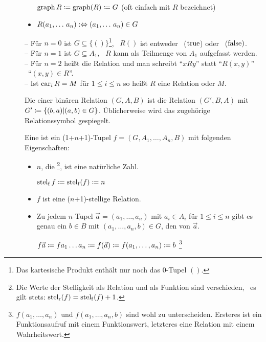 \begin{description}
\begin{itemize}
		$\operatorname*{graph} R \coloneqq \operatorname*{graph}(R) \coloneqq G$ (oft einfach mit $R$ bezeichnet)
		\item $R(a_1,\dots\,a_n) :\Leftrightarrow (a_1,\dots\,a_n) \in G$
	\end{itemize}
	-- Für $n=0$ ist $G \subseteq \{()\}$\footnote{Das kartesische Produkt enthält nur noch das $0$-Tupel $()$.}, \textdh\ $R()$ ist entweder \wahr\ ($\mathrm{true}$) oder \falsch\ ($\mathrm{false})$.
	\\-- Für $n=1$ ist $G \subseteq A_1$, \textdh\ $R$ kann als Teilmenge von $A_1$ aufgefasst werden.
	\\-- Für $n=2$ heißt die Relation  und man schreibt \enquote{$x R y$} statt \enquote{$R(x,y)$} \textbzw\ \enquote{$(x,y) \in R$}.
	\\-- Ist $\operatorname*{car}_i R = M$ für $1 \le i \le n$ so heißt $R$ eine Relation  oder  $M$.

	\item [\Umkehrrelation] Die  einer binären Relation $(G,A,B)$ ist die Relation $(G',B,A)$ mit $G' \coloneqq \{(b,a)|(a,b) \in G\}$.
	Üblicherweise wird das zugehörige Relationssymbol gespiegelt.

	\item [\Funktion] Eine  ist ein (1+$n$+1)-Tupel $f = (G,A_1,\dots,A_n,B)$ mit folgenden Eigenschaften:
	\begin{itemize}
		\item $n$, die %
		\footnote{%
			Die Werte der Stelligkeit als Relation und als Funktion sind verschieden, \textdh\ es gilt stets: $\operatorname*{stel_r}(f) = \operatorname*{stel_f}(f) + 1$.
		},
		ist eine natürliche Zahl.

		$\operatorname*{stel_f} f \coloneqq \operatorname*{stel_f}(f) \coloneqq n$

		\item $f$ ist eine ($n$+1)-stellige Relation.

		\item Zu jedem $n$-Tupel $\vec{a} = (a_1,\dots,a_n)$ mit $a_i \in A_i$ für $1 \le i \le n$ gibt es genau ein $b \in B$ mit $(a_1,\dots,a_n,b) \in G$, den  von $\vec{a}$.

		$f\vec{a} \coloneqq f a_1 \dots a_n \coloneqq f(\vec{a}) \coloneqq f(a_1,\dots,a_n) \coloneqq b$
		\footnote{%
			$f(a_1,\dots,a_n)$ und $f(a_1,\dots,a_n,b)$ sind wohl zu unterscheiden.
			Ersteres ist ein Funktionsaufruf mit einem Funktionswert, letzteres eine Relation mit einem Wahrheitswert.
		}


\end{itemize}
\end{description}
